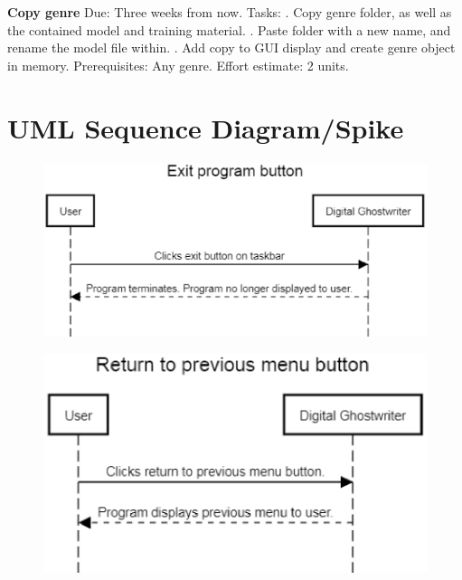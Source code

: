 \documentclass[12pt]{article}
\begin{document}
\textbf{Copy genre}\newline
Due: Three weeks from now.
\newline
Tasks:
. Copy genre folder, as well as the contained model and training material.
. Paste folder with a new name, and rename the model file within.
. Add copy to GUI display and create genre object in memory.
\newline
Prerequisites: Any genre.
\newline
Effort estimate: 2 units.

\newpage

\section{UML Sequence Diagram/Spike}

\begin{figure}[ht]
  \centering
    \includegraphics[scale=0.7]{Exit.eps}
\end{figure}

\begin{figure}[ht]
  \centering
    \includegraphics[scale=1]{Return.eps}
\end{figure}
\end{document}

